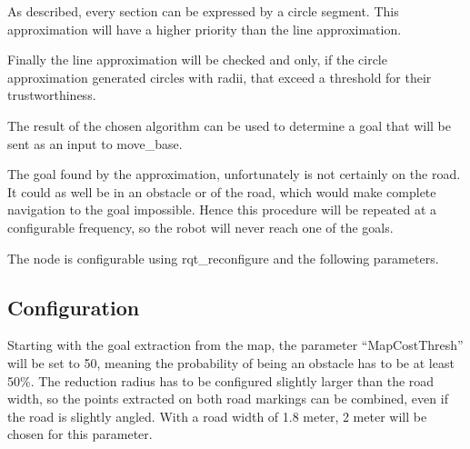 As described, every section can be expressed by a circle segment. This approximation will have a higher priority than the line approximation.

Finally the line approximation will be checked and only, if the circle approximation generated circles with radii, that exceed a threshold for their trustworthiness.

The result of the chosen algorithm can be used to determine a goal that will be sent as an input to move\_base.

The goal found by the approximation, unfortunately is not certainly on the road. It could as well be in an obstacle or of the road, which would make complete navigation to the goal impossible. Hence this procedure will be repeated at a configurable frequency, so the robot will never reach one of the goals. 

The node is configurable using rqt\_reconfigure and the following parameters.

\begin{table}[H]
\centering
{}

\caption{PoseFinder parameters}
\label{posefinderparams}

\end{table}

\subsection{Configuration}


Starting with the goal extraction from the map, the parameter ``MapCostThresh'' will be set to 50, meaning the probability of being an obstacle has to be at least 50\%. The reduction radius has to be configured slightly larger than the road width, so the points extracted on both road markings can be combined, even if the road is slightly angled. With a road width of 1.8 meter, 2 meter will be chosen for this parameter.\\

